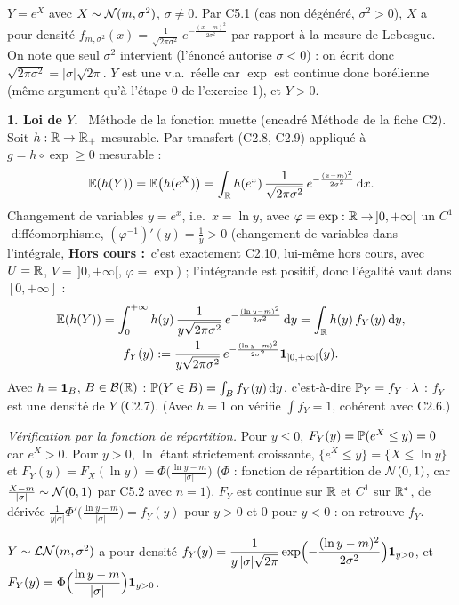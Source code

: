 \documentclass[11pt,a4paper]{article}
\newcommand{\question}[1]{\par\medskip\noindent\textbf{#1}~}
\newcommand{\HC}{\textbf{Hors cours :}~}
\begin{document}
\begin{exo}

$Y=e^X$ avec $X\sim\mathcal{N}(m,\sigma^2)$, $\sigma\ne0$. Par C5.1 (cas non dégénéré, $\sigma^2>0$), $X$ a pour densité
$f_{m,\sigma^2}(x)=\frac{1}{\sqrt{2\pi\sigma^2}}\,e^{-\frac{(x-m)^2}{2\sigma^2}}$ par rapport à la mesure de Lebesgue.
On note que seul $\sigma^2$ intervient (l'énoncé autorise $\sigma<0$) : on écrit donc $\sqrt{2\pi\sigma^2}=|\sigma|\sqrt{2\pi}$.
$Y$ est une v.a.\ réelle car $\exp$ est continue donc borélienne (même argument qu'à l'étape 0 de l'exercice 1), et $Y>0$.

\question{1. Loi de $Y$.} Méthode de la fonction muette (encadré Méthode de la fiche C2). Soit $h:\mathbb{R}\to\mathbb{R}_+$ mesurable.
Par transfert (C2.8, C2.9) appliqué à $g=h\circ\exp\ge0$ mesurable :
\[\mathbb{E}(h(Y))=\mathbb{E}\bigl(h(e^X)\bigr)=\int_{\mathbb{R}} h(e^x)\,\frac{1}{\sqrt{2\pi\sigma^2}}\,e^{-\frac{(x-m)^2}{2\sigma^2}}\,\mathrm{d} x .\]
Changement de variables $y=e^x$, i.e.\ $x=\ln y$, avec $\varphi=\exp:\mathbb{R}\to\,]0,+\infty[$ un $C^1$-difféomorphisme,
$(\varphi^{-1})'(y)=\frac1y>0$ (changement de variables dans l'intégrale, \HC c'est exactement C2.10, lui-même hors cours, avec $U=\mathbb{R}$, $V=\,]0,+\infty[$, $\varphi=\exp$) ; l'intégrande est positif, donc l'égalité vaut dans $[0,+\infty]$ :
\begin{gather*}\mathbb{E}(h(Y))=\int_0^{+\infty}h(y)\,\frac{1}{y\sqrt{2\pi\sigma^2}}\,e^{-\frac{(\ln y-m)^2}{2\sigma^2}}\,\mathrm{d} y=\int_{\mathbb{R}} h(y)\,f_Y(y)\,\mathrm{d} y,\\
f_Y(y):=\frac{1}{y\sqrt{2\pi\sigma^2}}\,e^{-\frac{(\ln y-m)^2}{2\sigma^2}}\mathbf{1}_{]0,+\infty[}(y).\end{gather*}
Avec $h=\mathbf{1}_B$, $B\in\mathcal{B}(\mathbb{R})$ : $\mathbb{P}(Y\in B)=\int_B f_Y(y)\,\mathrm{d} y$, c'est-à-dire $\mathbb{P}_Y=f_Y\cdot\lambda$ : $f_Y$ est une densité de $Y$ (C2.7).
(Avec $h=1$ on vérifie $\int f_Y=1$, cohérent avec C2.6.)

\emph{Vérification par la fonction de répartition.} Pour $y\le0$, $F_Y(y)=\mathbb{P}(e^X\le y)=0$ car $e^X>0$. Pour $y>0$, $\ln$ étant strictement
croissante, $\{e^X\le y\}=\{X\le\ln y\}$ et $F_Y(y)=F_X(\ln y)=\Phi\bigl(\frac{\ln y-m}{|\sigma|}\bigr)$ ($\Phi$ : fonction de répartition de
$\mathcal{N}(0,1)$, car $\frac{X-m}{|\sigma|}\sim\mathcal{N}(0,1)$ par C5.2 avec $n=1$). $F_Y$ est continue sur $\mathbb{R}$ et $C^1$ sur $\mathbb{R}^*$, de dérivée
$\frac{1}{y|\sigma|}\Phi'\bigl(\frac{\ln y-m}{|\sigma|}\bigr)=f_Y(y)$ pour $y>0$ et $0$ pour $y<0$ : on retrouve $f_Y$.

\begin{resultat}
$Y\sim\mathcal{LN}(m,\sigma^2)$ a pour densité \quad
$\displaystyle f_Y(y)=\frac{1}{y\,|\sigma|\sqrt{2\pi}}\exp\Bigl(-\frac{(\ln y-m)^2}{2\sigma^2}\Bigr)\mathbf{1}_{y>0}$,
\quad et $F_Y(y)=\Phi\Bigl(\dfrac{\ln y-m}{|\sigma|}\Bigr)\mathbf{1}_{y>0}$.
\end{resultat}


\end{exo}
\end{document}
